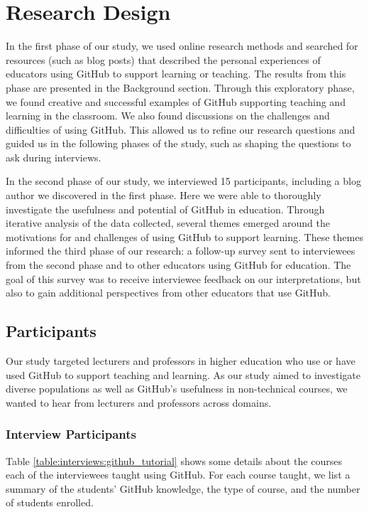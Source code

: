 \section{Research Design}
In the first phase of our study, we used online research methods \cite{wakeford2008fieldnotes} and searched for resources (such as blog posts) that described the personal experiences of educators using GitHub to support learning or teaching. The results from this phase are presented in the Background section. Through this exploratory phase, we found creative and successful examples of GitHub supporting teaching and learning in the classroom. We also found discussions on the challenges and difficulties of using GitHub. This allowed us to refine our research questions and guided us in the following phases of the study, such as shaping the questions to ask during interviews.

In the second phase of our study, we interviewed 15 participants, including a blog author we discovered in the first phase. Here we were able to thoroughly investigate the usefulness and potential of GitHub in education. Through iterative analysis of the data collected, several themes emerged around the motivations for and challenges of using GitHub to support learning. These themes informed the third phase of our research: a follow-up survey sent to interviewees from the second phase and to other educators using GitHub for education. The goal of this survey was to receive interviewee feedback on our interpretations, but also to gain additional perspectives from other educators that use GitHub.

\subsection{Participants}
Our study targeted lecturers and professors in higher education who use or have used GitHub to support teaching and learning. As our study aimed to investigate diverse populations as well as GitHub's usefulness in non-technical courses, we wanted to hear from lecturers and professors across domains.

\subsubsection{Interview Participants}
Table \ref{table:interviews:github_tutorial} shows some details about the courses each of the interviewees taught using GitHub. For each course taught, we list a summary of the students' GitHub knowledge, the type of course, and the number of students enrolled.

